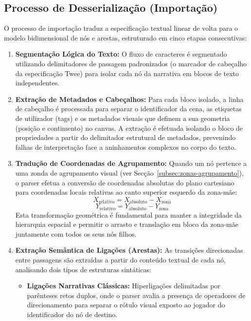 \subsection{Processo de Desserialização (Importação)}
O processo de importação traduz a especificação textual linear de volta para o modelo bidimensional de nós e arestas, estruturado em cinco etapas consecutivas:
\begin{enumerate}
    \item \textbf{Segmentação Lógica do Texto:} O fluxo de caracteres é segmentado utilizando delimitadores de passagem padronizados (o marcador de cabeçalho da especificação Twee) para isolar cada nó da narrativa em blocos de texto independentes.
    
    \item \textbf{Extração de Metadados e Cabeçalhos:} Para cada bloco isolado, a linha de cabeçalho é processada para separar o identificador da cena, as etiquetas de utilizador (tags) e os metadados visuais que definem a sua geometria (posição e contimento) no canvas. A extração é efetuada isolando o bloco de propriedades a partir do delimitador estrutural de metadados, prevenindo falhas de interpretação face a aninhamentos complexos no corpo do texto.
    
    \item \textbf{Tradução de Coordenadas de Agrupamento:} Quando um nó pertence a uma zonda de agrupamento visual (ver Secção~\ref{subsec:zonas-agrupamento}), o parser efetua a conversão de coordenadas absolutas do plano cartesiano para coordenadas locais relativas ao canto superior esquerdo da zona-mãe:
    \[
    X_{\text{relativo}} = X_{\text{absoluto}} - X_{\text{zona}}
    \]
    \[
    Y_{\text{relativo}} = Y_{\text{absoluto}} - Y_{\text{zona}}
    \]
    Esta transformação geométrica é fundamental para manter a integridade da hierarquia espacial e permitir o arrasto e translação em bloco da zona-mãe juntamente com todos os seus nós filhos.
    
    \item \textbf{Extração Semântica de Ligações (Arestas):} As transições direcionadas entre passagens são extraídas a partir do conteúdo textual de cada nó, analisando dois tipos de estruturas sintáticas:
    \begin{itemize}
        \item \textbf{Ligações Narrativas Clássicas:} Hiperligações delimitadas por parênteses retos duplos, onde o parser avalia a presença de operadores de direcionamento para separar o rótulo visual exposto ao jogador do identificador do nó de destino.
        

\end{itemize}
\end{enumerate}
